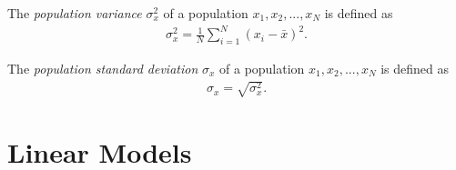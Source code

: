 \documentclass{article}
\begin{document}
\begin{definition}
	The \emph{population variance} $\sigma_x^2$ of a population $x_1, x_2, ..., x_N$ is defined as
	\begin{align*}
		\sigma_x^2 =\frac{1}{N}\sum_{i=1}^N (x_i-\bar x)^2.
	\end{align*}
\end{definition}
\begin{definition}
	The \emph{population standard deviation} $\sigma_x$ of a population $x_1, x_2, ..., x_N$ is defined as
	\begin{align*}
		\sigma_x = \sqrt{\sigma_x^2}.
	\end{align*}
\end{definition}


\section{Linear Models}
\end{document}
